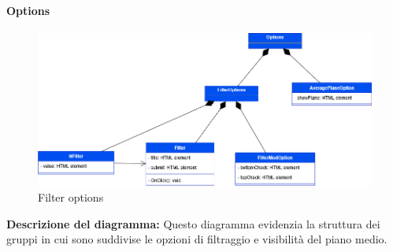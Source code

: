 \paragraph{Options}
\begin{figure}[h!] \centering
    \includegraphics[scale=0.45]{template/images/uml_front/ui/options.png}
    \caption{Filter options}
\end{figure}
\textbf{Descrizione del diagramma:}
Questo diagramma evidenzia la struttura dei gruppi in cui sono suddivise le opzioni di filtraggio e visibilità del piano medio.

